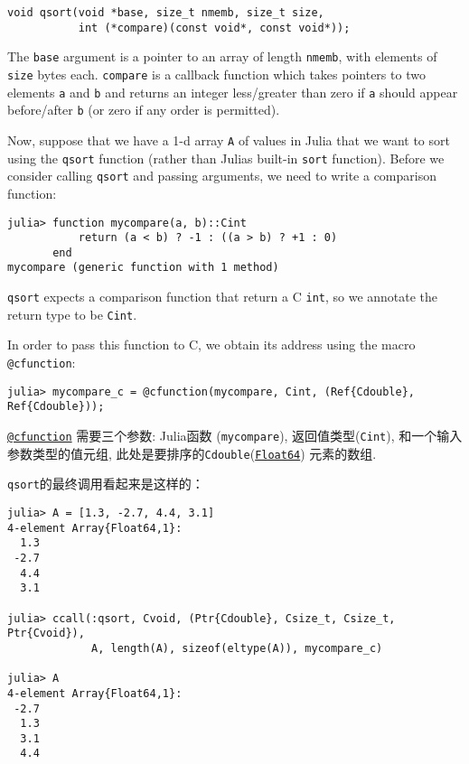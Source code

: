 \begin{lstlisting}
void qsort(void *base, size_t nmemb, size_t size,
           int (*compare)(const void*, const void*));
\end{lstlisting}



The \texttt{base} argument is a pointer to an array of length \texttt{nmemb}, with elements of \texttt{size} bytes each. \texttt{compare} is a callback function which takes pointers to two elements \texttt{a} and \texttt{b} and returns an integer less/greater than zero if \texttt{a} should appear before/after \texttt{b} (or zero if any order is permitted).



Now, suppose that we have a 1-d array \texttt{A} of values in Julia that we want to sort using the \texttt{qsort} function (rather than Julia{\textquotesingle}s built-in \texttt{sort} function). Before we consider calling \texttt{qsort} and passing arguments, we need to write a comparison function:




\begin{verbatim}
julia> function mycompare(a, b)::Cint
           return (a < b) ? -1 : ((a > b) ? +1 : 0)
       end
mycompare (generic function with 1 method)
\end{verbatim}



\texttt{qsort} expects a comparison function that return a C \texttt{int}, so we annotate the return type to be \texttt{Cint}.



In order to pass this function to C, we obtain its address using the macro \texttt{@cfunction}:




\begin{verbatim}
julia> mycompare_c = @cfunction(mycompare, Cint, (Ref{Cdouble}, Ref{Cdouble}));
\end{verbatim}



\hyperlink{11617107520401351255}{\texttt{@cfunction}} 需要三个参数: Julia函数 (\texttt{mycompare}), 返回值类型(\texttt{Cint}), 和一个输入参数类型的值元组, 此处是要排序的\texttt{Cdouble}(\hyperlink{5027751419500983000}{\texttt{Float64}}) 元素的数组.



\texttt{qsort}的最终调用看起来是这样的：




\begin{verbatim}
julia> A = [1.3, -2.7, 4.4, 3.1]
4-element Array{Float64,1}:
  1.3
 -2.7
  4.4
  3.1

julia> ccall(:qsort, Cvoid, (Ptr{Cdouble}, Csize_t, Csize_t, Ptr{Cvoid}),
             A, length(A), sizeof(eltype(A)), mycompare_c)

julia> A
4-element Array{Float64,1}:
 -2.7
  1.3
  3.1
  4.4
\end{verbatim}



